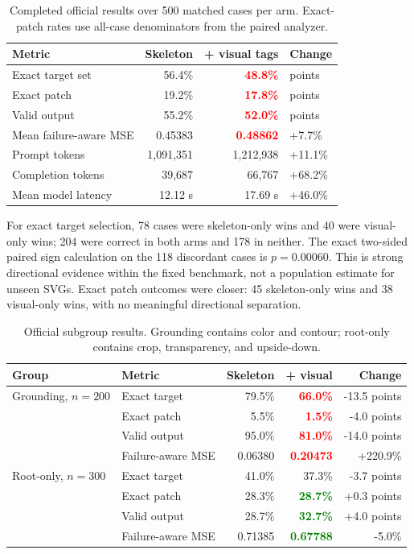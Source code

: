 \documentclass[10pt,a4paper]{article}
\newcommand{\good}[1]{\textcolor{green}{\textbf{#1}}}
\newcommand{\bad}[1]{\textcolor{red}{\textbf{#1}}}
\begin{document}
\begin{table}[H]
\centering
\caption{Completed official results over 500 matched cases per arm. Exact-patch
rates use all-case denominators from the paired analyzer.}
\begin{tabular}{@{}lrr>{\raggedleft\arraybackslash}p{25mm}@{}}
\toprule
\textbf{Metric} & \textbf{Skeleton} & \textbf{+ visual tags} & \textbf{Change}\\
\midrule
Exact target set & 56.4\% & \bad{48.8\%} & -7.6 points\\
Exact patch & 19.2\% & \bad{17.8\%} & -1.4 points\\
Valid output & 55.2\% & \bad{52.0\%} & -3.2 points\\
Mean failure-aware MSE & 0.45383 & \bad{0.48862} & +7.7\%\\
Prompt tokens & 1,091,351 & 1,212,938 & +11.1\%\\
Completion tokens & 39,687 & 66,767 & +68.2\%\\
Mean model latency & 12.12 s & 17.69 s & +46.0\%\\
\bottomrule
\end{tabular}
\end{table}

For exact target selection, 78 cases were skeleton-only wins and 40 were
visual-only wins; 204 were correct in both arms and 178 in neither. The exact
two-sided paired sign calculation on the 118 discordant cases is
\(p=0.00060\). This is strong directional evidence within the fixed benchmark,
not a population estimate for unseen SVGs. Exact patch outcomes were closer:
45 skeleton-only wins and 38 visual-only wins, with no meaningful directional
separation.

\begin{table}[H]
\centering
\caption{Official subgroup results. Grounding contains color and contour;
root-only contains crop, transparency, and upside-down.}
\label{tab:subgroup}
\begin{tabular}{@{}llrrr@{}}
\toprule
\textbf{Group} & \textbf{Metric} & \textbf{Skeleton} & \textbf{+ visual} & \textbf{Change}\\
\midrule
Grounding, \(n=200\) & Exact target & 79.5\% & \bad{66.0\%} & -13.5 points\\
 & Exact patch & 5.5\% & \bad{1.5\%} & -4.0 points\\
 & Valid output & 95.0\% & \bad{81.0\%} & -14.0 points\\
 & Failure-aware MSE & 0.06380 & \bad{0.20473} & +220.9\%\\
\addlinespace
Root-only, \(n=300\) & Exact target & 41.0\% & 37.3\% & -3.7 points\\
 & Exact patch & 28.3\% & \good{28.7\%} & +0.3 points\\
 & Valid output & 28.7\% & \good{32.7\%} & +4.0 points\\
 & Failure-aware MSE & 0.71385 & \good{0.67788} & -5.0\%\\
\bottomrule
\end{tabular}
\end{table}
\end{document}
